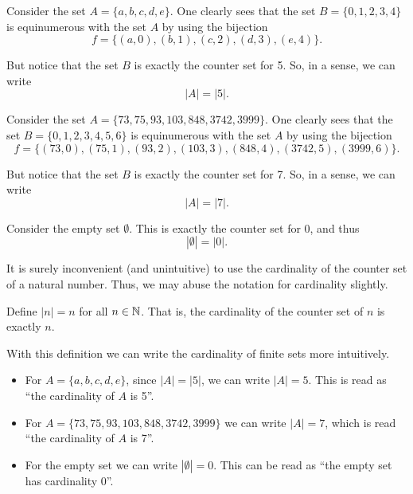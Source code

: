 \begin{example}[A Set of 5]
    Consider the set $A = \{a, b, c, d, e\}$. One clearly sees that the set $B = \{0, 1, 2, 3, 4\}$ is equinumerous with the set $A$ by using the bijection
    \[
        f = \{(a, 0), (b, 1), (c, 2), (d, 3), (e, 4)\}.
    \]

    But notice that the set $B$ is exactly the counter set for 5. So, in a sense, we can write
    \[
        |A| = |5|.
    \]
\end{example}

\begin{example}[A Set of 7]
    Consider the set $A = \{73, 75, 93, 103, 848, 3742, 3999\}$. One clearly sees that the set $B = \{0, 1, 2, 3, 4, 5, 6\}$ is equinumerous with the set $A$ by using the bijection
    \[
        f = \{(73, 0), (75, 1), (93, 2), (103, 3), (848, 4), (3742, 5), (3999, 6)\}.
    \]

    But notice that the set $B$ is exactly the counter set for 7. So, in a sense, we can write
    \[
        |A| = |7|.
    \]
\end{example}

\begin{example}[A Set of 0]
    Consider the empty set $\emptyset$. This is exactly the counter set for 0, and thus
    \[
        |\emptyset| = |0|.
    \]
\end{example}

It is surely inconvenient (and unintuitive) to use the cardinality of the counter set of a natural number. Thus, we may abuse the notation for cardinality slightly.

\begin{definition}
    Define $|n| = n$ for all $n \in \mathbb{N}$. That is, the cardinality of the counter set of $n$ is exactly $n$.
\end{definition}

With this definition we can write the cardinality of finite sets more intuitively.

\begin{example}
    \begin{itemize}[leftmargin=*]
        \item For $A = \{a, b, c, d, e\}$, since $|A| = |5|$, we can write $|A| = 5$. This is read as ``the cardinality of $A$ is 5''.
        \item For $A = \{73, 75, 93, 103, 848, 3742, 3999\}$ we can write $|A| = 7$, which is read ``the cardinality of $A$ is 7''.
        \item For the empty set we can write $|\emptyset| = 0$. This can be read as ``the empty set has cardinality 0''.
    \end{itemize}
\end{example}

